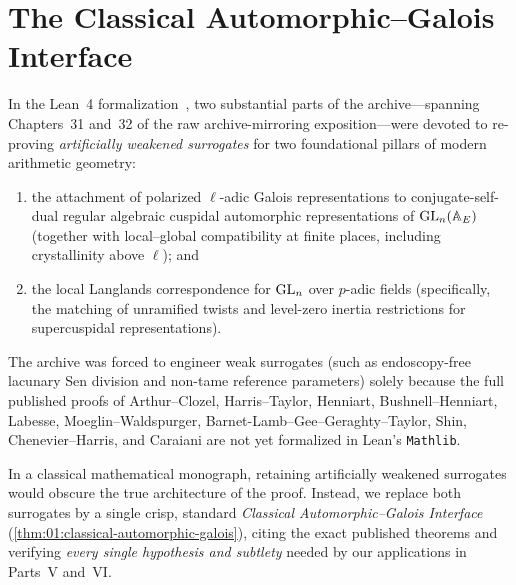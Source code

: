 \section{The Classical Automorphic--Galois Interface}
\label{sec:01:classical-interface}

In the Lean~4 formalization~\cite{Alpoge2026}, two substantial parts of the archive—spanning Chapters~31 and~32 of the raw archive-mirroring exposition—were devoted to re-proving \emph{artificially weakened surrogates} for two foundational pillars of modern arithmetic geometry:
\begin{enumerate}[label=(\arabic*)]
\item the attachment of polarized $\ell$-adic Galois representations to conjugate-self-dual regular algebraic cuspidal automorphic representations of $\mathrm{GL}_n(\mathbb{A}_E)$ (together with local--global compatibility at finite places, including crystallinity above $\ell$); and
\item the local Langlands correspondence for $\mathrm{GL}_n$ over $p$-adic fields (specifically, the matching of unramified twists and level-zero inertia restrictions for supercuspidal representations).
\end{enumerate}
The archive was forced to engineer weak surrogates (such as endoscopy-free lacunary Sen division and non-tame reference parameters) solely because the full published proofs of Arthur--Clozel, Harris--Taylor, Henniart, Bushnell--Henniart, Labesse, Moeglin--Waldspurger, Barnet-Lamb--Gee--Geraghty--Taylor, Shin, Chenevier--Harris, and Caraiani are not yet formalized in Lean's \texttt{Mathlib}.

In a classical mathematical monograph, retaining artificially weakened surrogates would obscure the true architecture of the proof. Instead, we replace both surrogates by a single crisp, standard \emph{Classical Automorphic--Galois Interface} (\cref{thm:01:classical-automorphic-galois}), citing the exact published theorems and verifying \emph{every single hypothesis and subtlety} needed by our applications in Parts~V and~VI.


